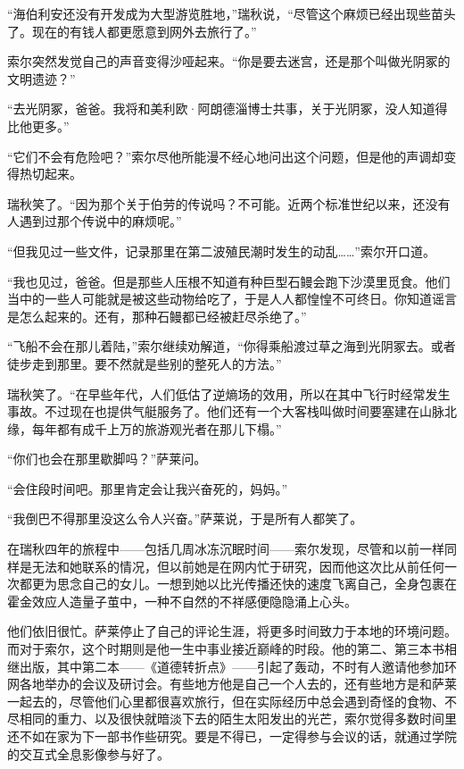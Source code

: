 \documentclass[AutoFakeBold=true]{book}
\begin{document}
``海伯利安还没有开发成为大型游览胜地，''瑞秋说，``尽管这个麻烦已经出现些苗头了。现在的有钱人都更愿意到网外去旅行了。''

索尔突然发觉自己的声音变得沙哑起来。``你是要去迷宫，还是那个叫做光阴冢的文明遗迹？''

``去光阴冢，爸爸。我将和美利欧·阿朗德淄博士共事，关于光阴冢，没人知道得比他更多。''

``它们不会有危险吧？''索尔尽他所能漫不经心地问出这个问题，但是他的声调却变得热切起来。

瑞秋笑了。``因为那个关于伯劳的传说吗？不可能。近两个标准世纪以来，还没有人遇到过那个传说中的麻烦呢。''

``但我见过一些文件，记录那里在第二波殖民潮时发生的动乱……''索尔开口道。

``我也见过，爸爸。但是那些人压根不知道有种巨型石鳗会跑下沙漠里觅食。他们当中的一些人可能就是被这些动物给吃了，于是人人都惶惶不可终日。你知道谣言是怎么起来的。还有，那种石鳗都已经被赶尽杀绝了。''

``飞船不会在那儿着陆，''索尔继续劝解道，``你得乘船渡过草之海到光阴冢去。或者徒步走到那里。要不然就是些别的整死人的方法。''

瑞秋笑了。``在早些年代，人们低估了逆熵场的效用，所以在其中飞行时经常发生事故。不过现在也提供气艇服务了。他们还有一个大客栈叫做时间要塞建在山脉北缘，每年都有成千上万的旅游观光者在那儿下榻。''

``你们也会在那里歇脚吗？''萨莱问。

``会住段时间吧。那里肯定会让我兴奋死的，妈妈。''

``我倒巴不得那里没这么令人兴奋。''萨莱说，于是所有人都笑了。

\vspace*{1em}

在瑞秋四年的旅程中——包括几周冰冻沉眠时间——索尔发现，尽管和以前一样同样是无法和她联系的情况，但以前她是在网内忙于研究，因而他这次比从前任何一次都更为思念自己的女儿。一想到她以比光传播还快的速度飞离自己，全身包裹在霍金效应人造量子茧中，一种不自然的不祥感便隐隐涌上心头。

他们依旧很忙。萨莱停止了自己的评论生涯，将更多时间致力于本地的环境问题。而对于索尔，这个时期则是他一生中事业接近巅峰的时段。他的第二、第三本书相继出版，其中第二本——《道德转折点》——引起了轰动，不时有人邀请他参加环网各地举办的会议及研讨会。有些地方他是自己一个人去的，还有些地方是和萨莱一起去的，尽管他们心里都很喜欢旅行，但在实际经历中总会遇到奇怪的食物、不尽相同的重力、以及很快就暗淡下去的陌生太阳发出的光芒，索尔觉得多数时间里还不如在家为下一部书作些研究。要是不得已，一定得参与会议的话，就通过学院的交互式全息影像参与好了。
\end{document}
